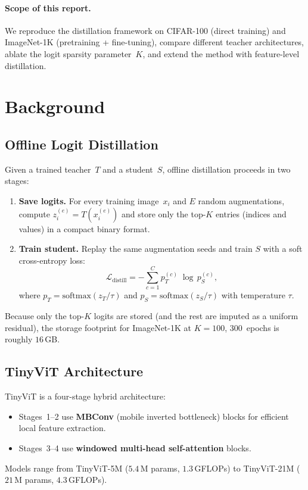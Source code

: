 \documentclass[10pt,twocolumn]{article}
\begin{document}
\paragraph{Scope of this report.}
We reproduce the distillation framework on CIFAR-100 (direct training) and
ImageNet-1K (pretraining + fine-tuning), compare different teacher
architectures, ablate the logit sparsity parameter~$K$, and extend the
method with feature-level distillation.

\section{Background}
\label{sec:background}

\subsection{Offline Logit Distillation}

Given a trained teacher~$T$ and a student~$S$, offline distillation
proceeds in two stages:

\begin{enumerate}
  \item \textbf{Save logits.} For every training image~$x_i$ and $E$ random
        augmentations, compute $z_i^{(e)}=T(x_i^{(e)})$ and store only the
        top-$K$ entries (indices and values) in a compact binary format.
  \item \textbf{Train student.} Replay the same augmentation seeds and train
        $S$ with a soft cross-entropy loss:
        \begin{equation}
          \mathcal{L}_{\text{distill}}
          = -\sum_{c=1}^{C} p_T^{(c)}\;\log\,p_S^{(c)},
          \label{eq:distill}
        \end{equation}
        where $p_T = \mathrm{softmax}(z_T/\tau)$ and
        $p_S = \mathrm{softmax}(z_S/\tau)$ with temperature $\tau$.
\end{enumerate}

Because only the top-$K$ logits are stored (and the rest are imputed as
a uniform residual), the storage footprint for ImageNet-1K at $K\!=\!100$,
$300$~epochs is roughly $16$\,GB.

\subsection{TinyViT Architecture}

TinyViT is a four-stage hybrid architecture:
\begin{itemize}
  \item Stages~1--2 use \textbf{MBConv} (mobile inverted bottleneck) blocks
        for efficient local feature extraction.
  \item Stages~3--4 use \textbf{windowed multi-head self-attention} blocks.
\end{itemize}
Models range from TinyViT-5M ($5.4$\,M params, $1.3$\,GFLOPs) to
TinyViT-21M ($21$\,M params, $4.3$\,GFLOPs).
\end{document}
